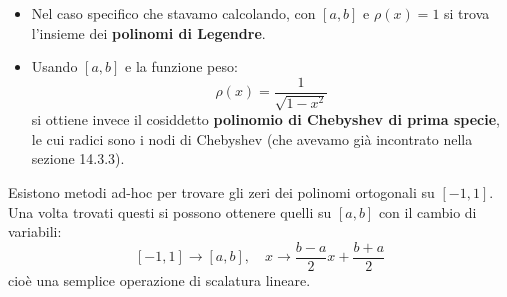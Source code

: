 \documentclass[a4paper,11pt]{article}
\begin{document}
\begin{itemize}
	\item
		Nel caso specifico che stavamo calcolando, con $[a, b]$ e $\rho(x) = 1$ si trova l'insieme dei \textbf{polinomi di Legendre}.
	\item 
		Usando $[a, b]$ e la funzione peso:
		$$
		\rho(x) = \frac{1}{\sqrt{1 - x^2}}
		$$
		si ottiene invece il cosiddetto \textbf{polinomio di Chebyshev di prima specie}, le cui radici sono i nodi di Chebyshev (che avevamo già incontrato nella sezione 14.3.3).
\end{itemize}

Esistono metodi ad-hoc per trovare gli zeri dei polinomi ortogonali su $[-1, 1]$. 
Una volta trovati questi si possono ottenere quelli su $[a, b]$ con il cambio di variabili:
$$
[-1, 1] \rightarrow [a, b], \quad x \rightarrow \frac{b - a}{2} x + \frac{b + a}{2}
$$
cioè una semplice operazione di scalatura lineare.
\end{document}
